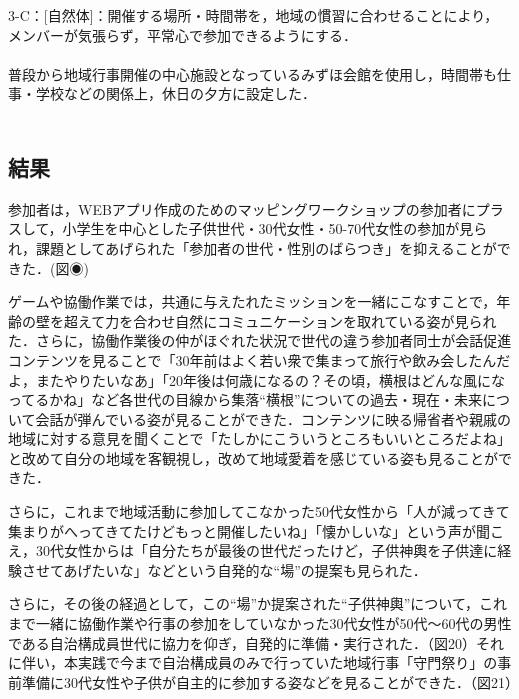 \documentclass[a4paper]{jsarticle}
\begin{document}
3-C：[自然体]：開催する場所・時間帯を，地域の慣習に合わせることにより，メンバーが気張らず，平常心で参加できるようにする．\\\\
普段から地域行事開催の中心施設となっているみずほ会館を使用し，時間帯も仕事・学校などの関係上，休日の夕方に設定した．\\\\
\subsection{結果}
参加者は，WEBアプリ作成のためのマッピングワークショップの参加者にプラスして，小学生を中心とした子供世代・30代女性・50-70代女性の参加が見られ，課題としてあげられた「参加者の世代・性別のばらつき」を抑えることができた．(図◉)\par
ゲームや協働作業では，共通に与えたれたミッションを一緒にこなすことで，年齢の壁を超えて力を合わせ自然にコミュニケーションを取れている姿が見られた．さらに，協働作業後の仲がほぐれた状況で世代の違う参加者同士が会話促進コンテンツを見ることで「30年前はよく若い衆で集まって旅行や飲み会したんだよ，またやりたいなあ」「20年後は何歳になるの？その頃，横根はどんな風になってるかね」など各世代の目線から集落“横根”についての過去・現在・未来について会話が弾んでいる姿が見ることができた．コンテンツに映る帰省者や親戚の地域に対する意見を聞くことで「たしかにこういうところもいいところだよね」と改めて自分の地域を客観視し，改めて地域愛着を感じている姿も見ることができた．\par
さらに，これまで地域活動に参加してこなかった50代女性から「人が減ってきて集まりがへってきてたけどもっと開催したいね」「懐かしいな」という声が聞こえ，30代女性からは「自分たちが最後の世代だったけど，子供神輿を子供達に経験させてあげたいな」などという自発的な“場”の提案も見られた．\par
さらに，その後の経過として，この“場”か提案された“子供神輿”について，これまで一緒に協働作業や行事の参加をしていなかった30代女性が50代〜60代の男性である自治構成員世代に協力を仰ぎ，自発的に準備・実行された．（図20）それに伴い，本実践で今まで自治構成員のみで行っていた地域行事「守門祭り」の事前準備に30代女性や子供が自主的に参加する姿などを見ることができた．（図21）
\end{document}
